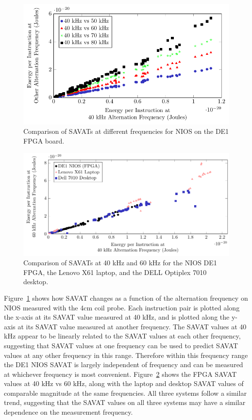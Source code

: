 \begin{figure}[htb]
	\centering
	\includegraphics[width=5in]{../emc_comparison_4/freq_depend.pdf}
	\caption{Comparison of SAVATs at different frequencies for NIOS on the DE1 FPGA board. }
  \label{fig:fdepend_nios}
\end{figure}

\begin{figure}[hbt]
	\centering
	\includegraphics[width=\textwidth]{../emc_comparison_4/freq_depend_compare.pdf}
	\caption{Comparison of SAVATs at 40 kHz and 60 kHz for the NIOS DE1 FPGA, the Lenovo X61 laptop, and the DELL Optiplex 7010 desktop.}   \label{fig:fdepend_compare}
\end{figure}


Figure~\ref{fig:fdepend_nios} shows how SAVAT changes as a function of the alternation frequency on NIOS measured with the 4cm coil probe.%
Each instruction pair is plotted along the x-axis at its SAVAT value measured at 40 kHz, and is plotted along the y-axis at its SAVAT value measured at another frequency. The SAVAT values at 40 kHz appear to be linearly related to the SAVAT values at each other frequency, suggesting that SAVAT values at one frequency can be used to predict SAVAT values at any other frequency in this range. Therefore within this frequency range the DE1 NIOS SAVAT is largely independent of frequency and can be measured at whichever frequency is most convenient. Figure~\ref{fig:fdepend_compare} shows the FPGA SAVAT values at 40 kHz vs 60 kHz, along with the laptop and desktop SAVAT values of comparable magnitude at the same frequencies. All three systems follow a similar trend, suggesting that the SAVAT values on all three systems may have a similar dependence on the measurement frequency.


